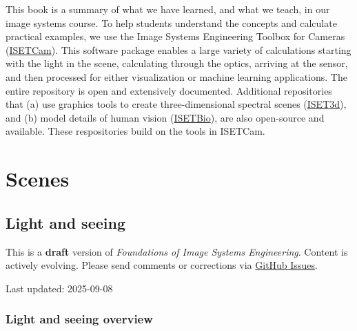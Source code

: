\documentclass[
  letterpaper,
]{book}
\begin{document}
This book is a summary of what we have learned, and what we teach, in
our image systems course. To help students understand the concepts and
calculate practical examples, we use the Image Systems Engineering
Toolbox for Cameras
(\href{https://github.com/iset/isetcam/wiki}{ISETCam}). This software
package enables a large variety of calculations starting with the light
in the scene, calculating through the optics, arriving at the sensor,
and then processed for either visualization or machine learning
applications. The entire repository is open and extensively documented.
Additional repositories that (a) use graphics tools to create
three-dimensional spectral scenes
(\href{https://github.com/iset/iset3d-tiny/wiki}{ISET3d}), and (b) model
details of human vision
(\href{https://github.com/isetbio/isetbio/wiki}{ISETBio}), are also
open-source and available. These respositories build on the tools in
ISETCam.

\part{Scenes}

\chapter{Light and seeing}\label{sec-light}

\begin{tcolorbox}[enhanced jigsaw, colframe=quarto-callout-warning-color-frame, titlerule=0mm, rightrule=.15mm, opacitybacktitle=0.6, colback=white, leftrule=.75mm, coltitle=black, title=\textcolor{quarto-callout-warning-color}{\faExclamationTriangle}\hspace{0.5em}{Work in Progress}, bottomrule=.15mm, colbacktitle=quarto-callout-warning-color!10!white, breakable, left=2mm, bottomtitle=1mm, toptitle=1mm, opacityback=0, arc=.35mm, toprule=.15mm]

This is a \textbf{draft} version of \emph{Foundations of Image Systems
Engineering}. Content is actively evolving. Please send comments or
corrections via \href{https://github.com/wandell/FISE-git/issues}{GitHub
Issues}.

Last updated: 2025-09-08

\end{tcolorbox}

\section{Light and seeing overview}\label{sec-light-overview}
\end{document}

